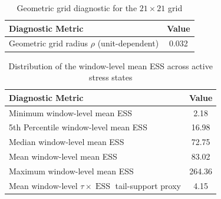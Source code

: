 \documentclass[11pt, a4paper]{article}
\begin{document}
\begin{table}[htbp]
\centering
\caption{Computational benchmark: adaptive exchange algorithm vs. dense grid approximation}
\label{tab:computational}
\end{table}

\begin{table}[htbp]
\centering
\caption{Geometric grid diagnostic for the $21\times21$ grid}
\label{tab:grid_bounds}
\begin{tabular}{lc}
\toprule
\textbf{Diagnostic Metric} & \textbf{Value} \\
\midrule
Geometric grid radius $\rho$ (unit-dependent) & 0.032 \\
\bottomrule
\end{tabular}
\end{table}

\begin{table}[htbp]
\centering
\caption{Distribution of the window-level mean ESS across active stress states}
\label{tab:ess_diagnostics}
\begin{tabular}{lc}
\toprule
\textbf{Diagnostic Metric} & \textbf{Value} \\
\midrule
Minimum window-level mean ESS & 2.18 \\
5th Percentile window-level mean ESS & 16.98 \\
Median window-level mean ESS & 72.75 \\
Mean window-level mean ESS & 83.02 \\
Maximum window-level mean ESS & 264.36 \\
Mean window-level $\tau\times \operatorname{ESS}$ tail-support proxy & 4.15 \\
\bottomrule
\end{tabular}
\end{table}
\end{document}

